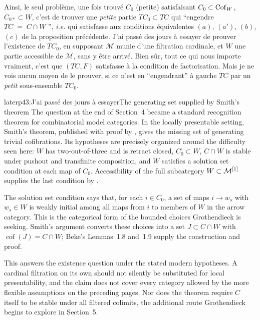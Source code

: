 Ainsi, le seul problème, une fois trouvé $C_0$ (petite) satisfaisant $C_0\subset\mathrm{Cof}_W$, $C_{0*}\subset W$, c'est de trouver une \textit{petite} partie $TC_0\subset TC$ qui “engendre $TC\;=\;C\cap W$ ”, \textit{i.e.} qui satisfasse aux conditions équivalentes $(a)$, $(a')$, $(b)$, $(c)$ de la proposition précédente. J'ai passé des jours à essayer de prouver l'existence de $TC_0$, en supposant $\mathcal{M}$ munie d'une filtration cardinale, et $W$ une partie accessible de $\mathcal{M}$, sans y être arrivé. Bien sûr, tout ce qui nous importe vraiment, c'est que $(TC,F)$ satisfasse à la condition de factorisation. Mais je ne vois aucun moyen de le prouver, si ce n'est en “engendrant” à gauche $TC$ par un \textit{petit} sous-ensemble $TC_0$.

\begin{dcomment}{later}{p43:J'ai passé des jours à essayer}{The generating set supplied by Smith's theorem}
The question at the end of Section~4 became a standard recognition theorem for combinatorial model categories. In the locally presentable setting, Smith's theorem, published with proof by \citet[Theorem~1.7]{Beke2000}, gives the missing set of generating trivial cofibrations. Its hypotheses are precisely organized around the difficulty seen here: $W$ has two-out-of-three and is retract closed, $C_0^{\square}\subset W$, $C\cap W$ is stable under pushout and transfinite composition, and $W$ satisfies a solution set condition at each map of $C_0$. Accessibility of the full subcategory $W\subset\mathcal{M}^{[1]}$ supplies the last condition by \citet[Proposition~1.15]{Beke2000}.

The solution set condition says that, for each $i\in C_0$, a set of maps $i\to w_s$ with $w_s\in W$ is weakly initial among all maps from $i$ to members of $W$ in the arrow category. This is the categorical form of the bounded choices Grothendieck is seeking. Smith's argument converts these choices into a set $J\subset C\cap W$ with $\operatorname{cof}(J)=C\cap W$; Beke's Lemmas~1.8 and~1.9 supply the construction and proof.

This answers the existence question under the stated modern hypotheses. A cardinal filtration on its own should not silently be substituted for local presentability, and the claim does not cover every category allowed by the more flexible assumptions on the preceding pages. Nor does the theorem require $C$ itself to be stable under all filtered colimits, the additional route Grothendieck begins to explore in Section~5.
\end{dcomment}


